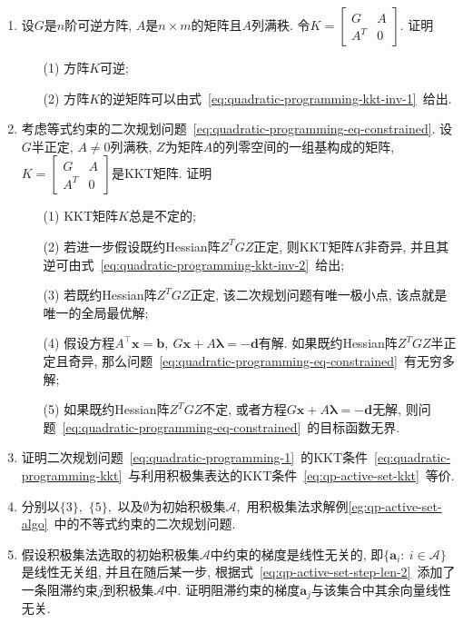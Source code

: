 \documentclass{SBCbookchapter}
\newcommand{\V}[1]{{\bm{#1}}}
\numberwithin{equation}{section}
\begin{document}
\begin{enumerate}
\item 设$G$是$n$阶可逆方阵, $A$是$n\times m$的矩阵且$A$列满秩. 令$K = \begin{bmatrix} G & A \\ A^T & 0 \end{bmatrix}.$ 证明
\begin{itemize}
    \item[(1)] 方阵$K$可逆;
    \item[(2)] 方阵$K$的逆矩阵可以由式~\eqref{eq:quadratic-programming-kkt-inv-1}~给出.
\end{itemize}

\item 考虑等式约束的二次规划问题~\eqref{eq:quadratic-programming-eq-constrained}. 设$G$半正定, $A \neq 0$列满秩, $Z$为矩阵$A$的列零空间的一组基构成的矩阵, $K = \begin{bmatrix} G & A \\ A^T & 0 \end{bmatrix}$是KKT矩阵. 证明
\begin{itemize}
    \item[(1)] KKT矩阵$K$总是不定的;
    \item[(2)] 若进一步假设既约Hessian阵$Z^T G Z$正定, 则KKT矩阵$K$非奇异, 并且其逆可由式~\eqref{eq:quadratic-programming-kkt-inv-2}~给出;
    \item[(3)] 若既约Hessian阵$Z^T G Z$正定, 该二次规划问题有唯一极小点, 该点就是唯一的全局最优解;
    \item[(4)] 假设方程$A^⊤ \V{x} = \V{b}, ~ G \V{x} + A \V{\lambda} = − \V{d}$有解. 如果既约Hessian阵$Z^T G Z$半正定且奇异, 那么问题~\eqref{eq:quadratic-programming-eq-constrained}~有无穷多解;
    \item[(5)] 如果既约Hessian阵$Z^T G Z$不定, 或者方程$G \V{x} + A \V{\lambda} = − \V{d}$无解, 则问题~\eqref{eq:quadratic-programming-eq-constrained}~的目标函数无界.
\end{itemize}

\item 证明二次规划问题~\eqref{eq:quadratic-programming-1}~的KKT条件~\eqref{eq:quadratic-programming-kkt}~与利用积极集表达的KKT条件~\eqref{eq:qp-active-set-kkt}~等价.

\item 分别以$\{3\},$ $\{5\},$ 以及$\emptyset$为初始积极集$\mathcal{A},$ 用积极集法求解例\ref{eg:qp-active-set-algo}~中的不等式约束的二次规划问题.

\item 假设积极集法选取的初始积极集$\mathcal{A}$中约束的梯度是线性无关的, 即$\{ \V{a}_i: ~ i \in \mathcal{A} \}$是线性无关组, 并且在随后某一步, 根据式~\eqref{eq:qp-active-set-step-len-2}~添加了一条阻滞约束$j$到积极集$\mathcal{A}$中. 证明阻滞约束的梯度$\V{a}_j$与该集合中其余向量线性无关.


\end{enumerate}
\end{document}
